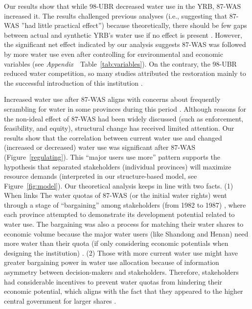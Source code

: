 
\label{discussion-1}
Our results show that while 98-UBR decreased water use in the YRB, 87-WAS increased it.
The results challenged previous analyses (i.e., suggesting that 87-WAS ''had little practical effect'') because theoretically, there should be few gaps between actual and synthetic YRB's water use if no effect is present \cite{abadie2015,hill2021}.
However, the significant net effect indicated by our analysis suggests 87-WAS was followed by more water use even after controlling for environmental and economic variables (see \textit{Appendix~}~Table~\ref{tab:variables}).
On the contrary, the 98-UBR reduced water competition, so many studies attributed the restoration mainly to the successful introduction of this institution \cite{chen2021,huangang2002,an2007}.

\label{discussion-2}
Increased water use after 87-WAS aligns with concerns about frequently scrambling for water in some provinces during this period \cite{mao2000}.
Although reasons for the non-ideal effect of 87-WAS had been widely discussed \cite{huangang2002} (such as enforcement, feasibility, and equity), structural change has received limited attention.
Our results show that the correlation between current water use and changed (increased or decreased) water use was significant after 87-WAS (Figure~\ref{regulating}).
This ``major users use more'' pattern supports the hypothesis that separated stakeholders (individual provinces) will maximize resource demands (interpreted in our structure-based model, see Figure~\ref{fig:model}).
Our theoretical analysis keeps in line with two facts.
(1) When links The water quotas of 87-WAS (or the initial water rights) went through a stage of ``bargaining'' among stakeholders (from 1982 to 1987) \cite{wang2019a, wang2019d}, where each province attempted to demonstrate its development potential related to water use.
The bargaining was also a process for matching their water shares to economic volume because the major water users (like Shandong and Henan) need more water than their quota (if only considering economic potentials when designing the institution) \cite{zuo2020}.
(2) Those with more current water use might have greater bargaining power in water use allocation because of information asymmetry between decision-makers and stakeholders.
Therefore, stakeholders had considerable incentives to prevent water quotas from hindering their economic potential, which aligns with the fact that they appeared to the higher central government for larger shares \cite{wang2019a, wang2019d}.


